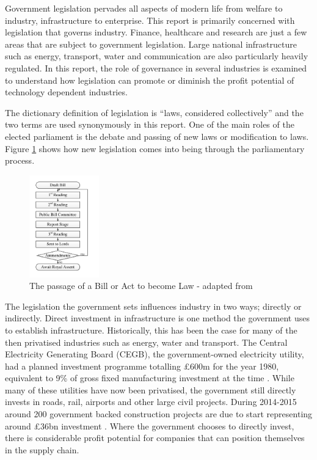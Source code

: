 
{}

Government legislation pervades all aspects of modern life from welfare to industry, infrastructure to enterprise.
This report is primarily concerned with legislation that governs industry.
Finance, healthcare and research are just a few areas that are subject to government legislation.
Large national infrastructure such as energy, transport, water and communication are also particularly heavily regulated.
In this report, the role of governance in several industries is examined to understand how legislation can promote or diminish the profit potential of technology dependent industries.

The dictionary definition of legislation is ``laws, considered collectively'' \cite{OED} and the two terms are used synonymously in this report.
One of the main roles of the elected parliament is the debate and passing of new laws or modification to laws.
Figure \ref{figure:passage} shows how new legislation comes into being through the parliamentary process.

\begin{figure}[!h]
\centering
\includegraphics[width = 0.27\textwidth]{Figures/BillFormulation.pdf}
\caption{The passage of a Bill or Act to become Law - adapted from \cite{Factsheet2010}}
\label{figure:passage}
\end{figure}

The legislation the government sets influences industry in two ways; directly or indirectly.
Direct investment in infrastructure is one method the government uses to establish infrastructure.
Historically, this has been the case for many of the then privatised industries such as energy, water and transport.
The Central Electricity Generating Board (CEGB), the government-owned electricity utility, had a planned investment programme totalling \pounds600m for the year 1980, equivalent to 9\% of gross fixed manufacturing investment at the time \cite{CEGB1980}.
While many of these utilities have now been privatised, the government still directly invests in roads, rail, airports and other large civil projects.
During 2014-2015 around 200 government backed construction projects are due to start representing around \pounds36bn investment \cite{GovPress2014}.
Where the government chooses to directly invest, there is considerable profit potential for companies that can position themselves in the supply chain. 

